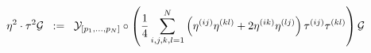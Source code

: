 \begin{equation}
\eta^2 \cdot \tau^2 {\cal{G}} \;\; :=\;\; {\cal{Y}}_{[ p_1 ,..., p_N ]} \circ \left( {1 \over 4} \sum_{i,j,k,l =1}^{N} \left( \eta^{(ij)} \eta^{(kl)} + 2 \eta^{(ik)} \eta^{(lj)} \right) \tau^{(ij)} \tau^{(kl)} \right) {\cal{G}}
\label{eq:x8}
\end{equation}

